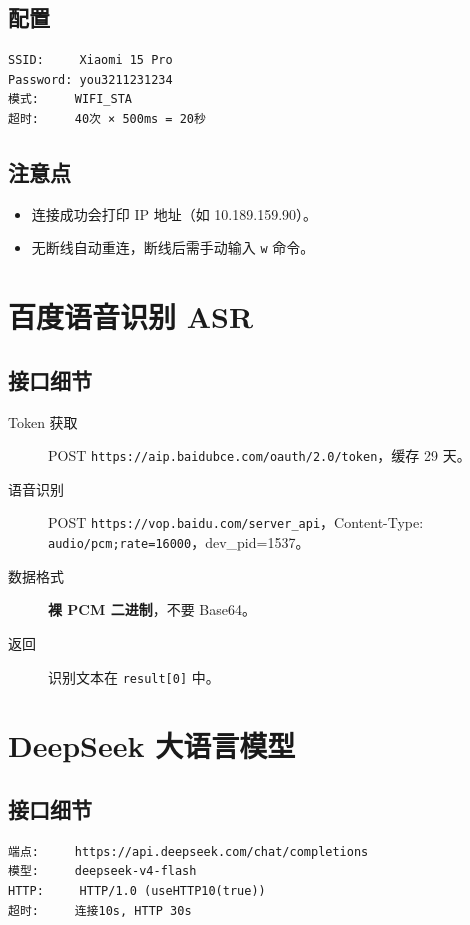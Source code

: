 \documentclass[12pt,a4paper,openany]{ctexbook}
\begin{document}
\subsection*{配置}
\begin{verbatim}
SSID:     Xiaomi 15 Pro
Password: you3211231234
模式:     WIFI_STA
超时:     40次 × 500ms = 20秒
\end{verbatim}

\subsection*{注意点}
\begin{itemize}
    \item 连接成功会打印 IP 地址（如 10.189.159.90）。
    \item 无断线自动重连，断线后需手动输入 \texttt{w} 命令。
\end{itemize}

\section{百度语音识别 ASR}

\subsection*{接口细节}
\begin{description}
    \item[Token 获取] POST \texttt{https://aip.baidubce.com/oauth/2.0/token}，缓存 29 天。
    \item[语音识别] POST \texttt{https://vop.baidu.com/server\_api}，Content-Type: \texttt{audio/pcm;rate=16000}，dev\_pid=1537。
    \item[数据格式] \textbf{裸 PCM 二进制}，不要 Base64。
    \item[返回] 识别文本在 \texttt{result[0]} 中。
\end{description}

\section{DeepSeek 大语言模型}

\subsection*{接口细节}
\begin{verbatim}
端点:     https://api.deepseek.com/chat/completions
模型:     deepseek-v4-flash
HTTP:     HTTP/1.0 (useHTTP10(true))
超时:     连接10s, HTTP 30s
\end{verbatim}
\end{document}
